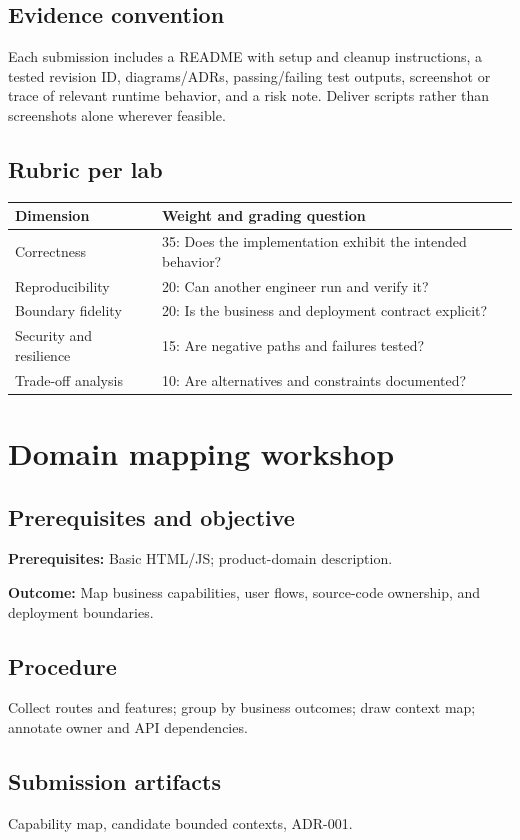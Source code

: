 \documentclass[11pt,letterpaper,oneside]{report}
\begin{document}
\section*{Evidence convention}
Each submission includes a README with setup and cleanup instructions, a tested revision ID, diagrams/ADRs, passing/failing test outputs, screenshot or trace of relevant runtime behavior, and a risk note. Deliver scripts rather than screenshots alone wherever feasible.
\section*{Rubric per lab}
\begin{tabularx}{\linewidth}{p{.25\linewidth}X}\toprule Dimension & Weight and grading question \\\midrule
Correctness & 35: Does the implementation exhibit the intended behavior?\\
Reproducibility & 20: Can another engineer run and verify it?\\
Boundary fidelity & 20: Is the business and deployment contract explicit?\\
Security and resilience & 15: Are negative paths and failures tested?\\
Trade-off analysis & 10: Are alternatives and constraints documented?\\\bottomrule\end{tabularx}

\chapter{Domain mapping workshop}
\section{Prerequisites and objective}
\textbf{Prerequisites:} Basic HTML/JS; product-domain description.\par
\textbf{Outcome:} Map business capabilities, user flows, source-code ownership, and deployment boundaries.
\section{Procedure}
Collect routes and features; group by business outcomes; draw context map; annotate owner and API dependencies.
\section{Submission artifacts}
Capability map, candidate bounded contexts, ADR-001.
\end{document}
